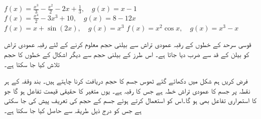 $f(x)=\tfrac{x^3}{3}-\tfrac{x^2}{2}-2x+\tfrac{1}{3},\quad g(x)=x-1$
$f(x)=\tfrac{x^4}{2}-3x^3+10,\quad g(x)=8-12x$
$f(x)=x+\sin(2x),\quad g(x)=x^3$
$f(x)=x^2\cos x,\quad g(x)=x^3-x$

قوسی سرحد کے خطوں کے رقبہ عمودی تراش سے بیلنی حجم معلوم کرنے کے لئے رقبہ عمودی تراش کو بیلن کے قد سے ضرب دیا جاتا ہے۔ اس طرز کے بیلنی حجم سے دیگر اشکال کے خطوں کا حجم تلاش کیا جا سکتا ہے۔

فرض کریں ہم شکل  میں دکھائے گئے ٹھوس جسم کا حجم دریافت کرنا چاہتے ہیں۔ بند وقفہ  کے ہر نقطہ  پر جسم کا عمودی تراش خطہ  ہے جس کا رقبہ  ہے۔ یوں  متغیر  کا حقیقی قیمت تفاعل ہو گا جو  کا استمراری تفاعل بھی ہو گا۔اس کو استعمال کرتے ہوئے جسم کے حجم کی تعریف پیش کی جا سکتی ہے جس کو درج ذیل طریقہ سے حاصل کیا جا سکتا ہے۔
